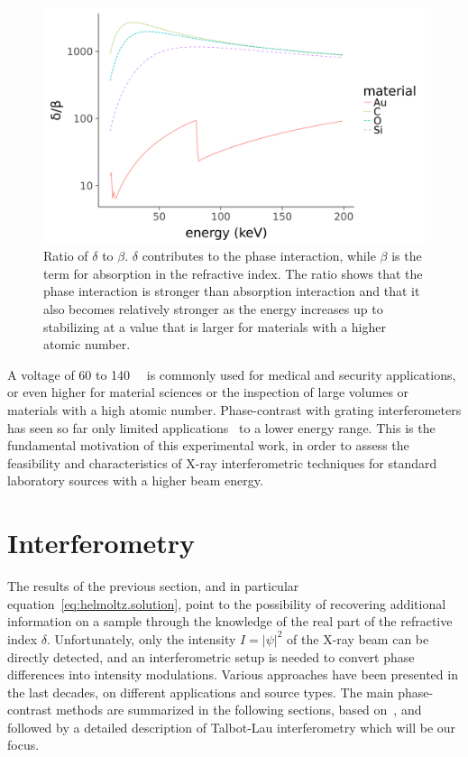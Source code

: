 \begin{figure}[htb]
    \centering
    \includegraphics[width=\textwidth]{gfx/delta-beta-comparison/delta-beta-comparison.png}
    \caption[Values of $\delta/\beta$ as a function of energy for different
    materials.]{Ratio of $\delta$ to $\beta$. $\delta$ contributes to the
    phase interaction, while $\beta$ is the term for absorption in the
refractive index. The ratio shows that the phase interaction is stronger
than absorption interaction and that it also becomes relatively stronger as
the energy increases up to stabilizing at a value that is larger for
materials with a higher atomic number.}
    \label{fig:delta.beta}
\end{figure}

A voltage of 60 to \SI{140}{\kilo\voltpeak} is commonly used for medical and
security applications, or even higher for material sciences or the
inspection of large volumes or materials with a high atomic number.
Phase-contrast with grating interferometers has seen so far only limited
applications~\parencite{Willner2013,Donath2009a} to a lower energy range.
This is the fundamental motivation of this experimental work, in order to
assess the feasibility and characteristics of X-ray interferometric
techniques for standard laboratory sources with a higher beam energy.

\section{Interferometry}
The results of the previous section, and in particular
equation~\eqref{eq:helmoltz.solution}, point to the possibility of recovering
additional information on a sample through the knowledge of the real part of
the refractive index $\delta$. Unfortunately, only the intensity $I =
|\psi|^2$ of the X-ray beam can be directly detected, and an interferometric
setup is needed to convert phase differences into intensity modulations.
Various approaches have been presented in the last decades, on different
applications and source types. The main phase-contrast methods are summarized in the
following sections, based on~\cite{2018NIMPA.878...88E}, and followed by a detailed
description of Talbot-Lau interferometry which will be our focus.

